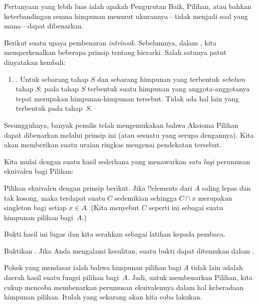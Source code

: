 \documentclass[../../../include/open-logic-section]{subfiles}
\begin{document}

Pertanyaan yang lebih luas ialah apakah Pengurutan Baik, Pilihan, atau bahkan
keterbandingan semua himpunan menurut ukurannya---tidak menjadi soal yang
mana---dapat dibenarkan.

Berikut suatu upaya pembenaran \emph{intrinsik}. Sebelumnya, dalam
, kita memperkenalkan beberapa prinsip tentang
hierarki. Salah satunya patut dinyatakan kembali:
\begin{enumerate}
	\item[] \stagesacc. Untuk sebarang tahap $S$ dan sebarang himpunan yang
	terbentuk \emph{sebelum} tahap $S$: pada tahap $S$ terbentuk suatu
	himpunan yang anggota-anggotanya tepat merupakan himpunan-himpunan
	tersebut. Tidak ada hal lain yang terbentuk pada tahap~$S$.
\end{enumerate}
Sesungguhnya, banyak penulis telah mengemukakan bahwa Aksioma Pilihan dapat
dibenarkan melalui prinsip ini (atau sesuatu yang serupa dengannya). Kita
akan memberikan suatu uraian ringkas mengenai pendekatan tersebut.

Kita mulai dengan suatu hasil sederhana yang menawarkan \emph{satu lagi}
perumusan ekuivalen bagi Pilihan:

\begin{thm}[dalam $\ZF$]
Pilihan ekuivalen dengan prinsip berikut. Jika !!{element}s dari $A$ saling
lepas dan tak kosong, maka terdapat suatu $C$ sedemikian sehingga
$C\cap x$ merupakan singleton bagi setiap $x\in A$. (Kita menyebut $C$
seperti ini sebagai suatu himpunan pilihan bagi~$A$.)
\end{thm}

Bukti hasil ini lugas dan kita serahkan sebagai latihan kepada pembaca.

\begin{prob}
Buktikan . Jika Anda mengalami
kesulitan, suatu bukti dapat ditemukan dalam
\cite[hlm.~242--243]{Potter2004}.
\end{prob}

Pokok yang mendasar ialah bahwa himpunan pilihan bagi $A$ tidak lain adalah
daerah hasil suatu fungsi pilihan bagi~$A$. Jadi, untuk membenarkan Pilihan,
kita cukup mencoba membenarkan perumusan ekuivalennya dalam hal keberadaan
himpunan pilihan. Itulah yang sekarang akan kita coba lakukan.
\end{document}
